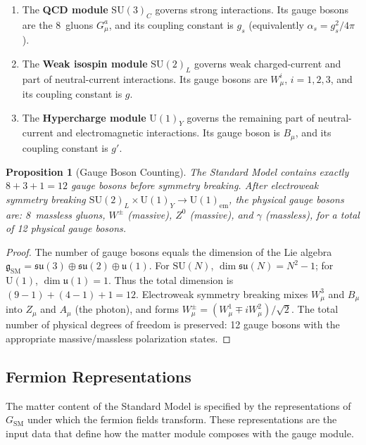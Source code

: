 \documentclass[12pt]{article}
\newtheorem{proposition}[theorem]{Proposition}
\theoremstyle{definition}
\theoremstyle{remark}
\newcommand{\su}[1]{\mathrm{SU}(#1)}
\newcommand{\uu}[1]{\mathrm{U}(#1)}
\begin{document}
\begin{enumerate}
\item The \textbf{QCD module} $\su{3}_C$ governs strong interactions. Its gauge bosons are the 8~gluons $G^a_\mu$, and its coupling constant is $g_s$ (equivalently $\alpha_s = g_s^2/4\pi$).

\item The \textbf{Weak isospin module} $\su{2}_L$ governs weak charged-current and part of neutral-current interactions. Its gauge bosons are $W^i_\mu$, $i = 1, 2, 3$, and its coupling constant is $g$.

\item The \textbf{Hypercharge module} $\uu{1}_Y$ governs the remaining part of neutral-current and electromagnetic interactions. Its gauge boson is $B_\mu$, and its coupling constant is $g'$.
\end{enumerate}

\begin{proposition}[Gauge Boson Counting]
\label{prop:boson-count}
The Standard Model contains exactly $8 + 3 + 1 = 12$ gauge bosons before symmetry breaking. After electroweak symmetry breaking $\su{2}_L \times \uu{1}_Y \to \uu{1}_{\mathrm{em}}$, the physical gauge bosons are: 8~massless gluons, $W^\pm$ (massive), $Z^0$ (massive), and $\gamma$ (massless), for a total of 12 physical gauge bosons.
\end{proposition}

\begin{proof}
The number of gauge bosons equals the dimension of the Lie algebra $\mathfrak{g}_{\mathrm{SM}} = \mathfrak{su}(3) \oplus \mathfrak{su}(2) \oplus \mathfrak{u}(1)$. For $\su{N}$, $\dim \mathfrak{su}(N) = N^2 - 1$; for $\uu{1}$, $\dim \mathfrak{u}(1) = 1$. Thus the total dimension is $(9-1) + (4-1) + 1 = 12$. Electroweak symmetry breaking mixes $W^3_\mu$ and $B_\mu$ into $Z_\mu$ and $A_\mu$ (the photon), and forms $W^\pm_\mu = (W^1_\mu \mp i W^2_\mu)/\sqrt{2}$. The total number of physical degrees of freedom is preserved: 12 gauge bosons with the appropriate massive/massless polarization states.
\end{proof}

\subsection{Fermion Representations}

The matter content of the Standard Model is specified by the representations of $G_{\mathrm{SM}}$ under which the fermion fields transform. These representations are the input data that define how the matter module composes with the gauge module.
\end{document}

